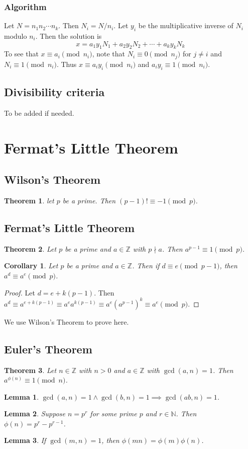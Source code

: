 \documentclass[letterpaper,12pt,oneside]{article}
\newtheorem{theorem}{Theorem}
\newtheorem*{corollary}{Corollary}
\newtheorem*{lemma}{Lemma}
\begin{document}
\subsubsection{Algorithm}
Let $N = n_1n_2\cdots n_k$. Then $N_i = N/n_i$. Let $y_i$ be the multiplicative inverse of $N_i$ modulo $n_i$. Then the solution is\[
    x = a_1y_1N_1+a_2y_2N_2+\cdots + a_ky_kN_k
\]
To see that $x\equiv a_i\pmod{n_i}$, note that $N_i\equiv 0\pmod{n_j}$ for $j\neq i$ and $N_i\equiv 1\pmod{n_i}$. Thus $x\equiv a_iy_i\pmod{n_i}$ and $a_iy_i\equiv 1\pmod{n_i}$.
\subsection{Divisibility criteria}
To be added if needed.
\section{Fermat's Little Theorem}
\subsection{Wilson's Theorem}
\begin{theorem}
    let $p$ be a prime. Then $(p-1)!\equiv -1\pmod{p}$.
\end{theorem}
\subsection{Fermat's Little Theorem}
\begin{theorem}
    Let $p$ be a prime and $a\in \mathbb{Z}$ with $p\nmid a$. Then $a^{p-1}\equiv 1\pmod{p}$.
\end{theorem}
\begin{corollary}
    Let $p$ be a prime and $a\in \mathbb{Z}$. Then if $d\equiv e\pmod{p-1}$, then $a^d\equiv a^e\pmod{p}$.
\end{corollary}
\begin{proof}
    Let $d=e+k(p-1)$. Then $a^d\equiv a^{e+k(p-1)}\equiv a^e a^{k(p-1)} \equiv a^e (a^{p-1})^k \equiv a^e\pmod{p}$.
\end{proof}
We use Wilson's Theorem to prove here. 
\subsection{Euler's Theorem}
\begin{theorem}
    Let $n\in \mathbb{Z}$ with $n>0$ and $a\in \mathbb{Z}$ with $\gcd(a,n) = 1$. Then $a^{\phi(n)}\equiv 1\pmod{n}$.
\end{theorem}
\begin{lemma}
    $\gcd(a,n) = 1 \land \gcd(b,n) = 1 \implies \gcd(ab,n) = 1$.
\end{lemma}
\begin{lemma}
    Suppose $n=p^r$ for some prime $p$ and $r\in \mathbb{N}$. Then $\phi(n) = p^r-p^{r-1}$.
\end{lemma}
\begin{lemma}
    If $\gcd(m,n) = 1$, then $\phi(mn) = \phi(m)\phi(n)$.
\end{lemma}
\end{document}
